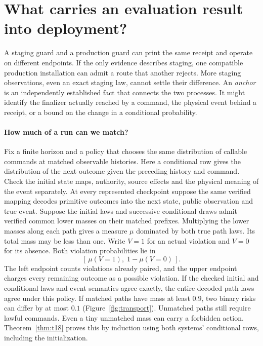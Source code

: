 \section{What carries an evaluation result into deployment?}\label{sec:transport}
A staging guard and a production guard can print the same receipt and operate on different endpoints. If the only evidence describes staging, one compatible production installation can admit a route that another rejects. More staging observations, even an exact staging law, cannot settle their difference. An \emph{anchor} is an independently established fact that connects the two processes. It might identify the finalizer actually reached by a command, the physical event behind a receipt, or a bound on the change in a conditional probability.

\paragraph{How much of a run can we match?}
Fix a finite horizon and a policy that chooses the same distribution of callable commands at matched observable histories. Here a conditional row gives the distribution of the next outcome given the preceding history and command. Check the initial state maps, authority, source effects and the physical meaning of the event separately. At every represented checkpoint suppose the same verified mapping decodes primitive outcomes into the next state, public observation and true event. Suppose the initial laws and successive conditional draws admit verified common lower masses on their matched prefixes. Multiplying the lower masses along each path gives a measure \(\mu\) dominated by both true path laws. Its total mass may be less than one. Write \(V=1\) for an actual violation and \(V=0\) for its absence. Both violation probabilities lie in
\[
 [\,\mu(V=1),\;1-\mu(V=0)\,].
\]
The left endpoint counts violations already paired, and the upper endpoint charges every remaining outcome as a possible violation. If the checked initial and conditional laws and event semantics agree exactly, the entire decoded path laws agree under this policy. If matched paths have mass at least \(0.9\), two binary risks can differ by at most \(0.1\) (Figure~\ref{fig:transport}). Unmatched paths still require lawful commands. Even a tiny unmatched mass can carry a forbidden action. Theorem~\ref{thm:t18} proves this by induction using both systems' conditional rows, including the initialization.


